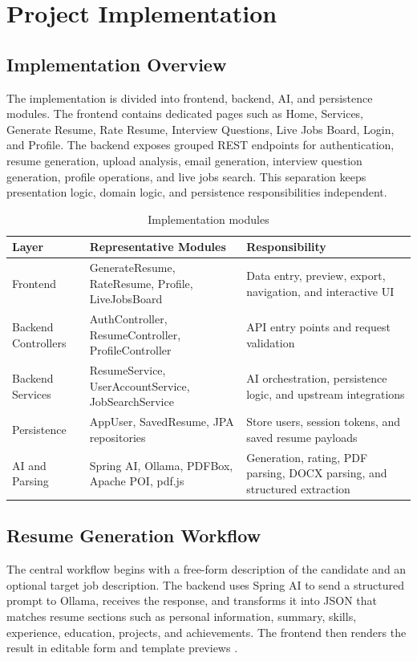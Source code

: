\section{Project Implementation}
\subsection{Implementation Overview}
\noindent The implementation is divided into frontend, backend, AI, and persistence modules. The frontend contains dedicated pages such as Home, Services, Generate Resume, Rate Resume, Interview Questions, Live Jobs Board, Login, and Profile. The backend exposes grouped REST endpoints for authentication, resume generation, upload analysis, email generation, interview question generation, profile operations, and live jobs search. This separation keeps presentation logic, domain logic, and persistence responsibilities independent.

\begin{table}[H]
\centering
\caption{Implementation modules}
\begin{tabular}{|p{3.3cm}|p{4.0cm}|p{4.8cm}|}
\hline
\textbf{Layer} & \textbf{Representative Modules} & \textbf{Responsibility} \\
\hline
Frontend & GenerateResume, RateResume, Profile, LiveJobsBoard & Data entry, preview, export, navigation, and interactive UI \\
\hline
Backend Controllers & AuthController, ResumeController, ProfileController & API entry points and request validation \\
\hline
Backend Services & ResumeService, UserAccountService, JobSearchService & AI orchestration, persistence logic, and upstream integrations \\
\hline
Persistence & AppUser, SavedResume, JPA repositories & Store users, session tokens, and saved resume payloads \\
\hline
AI and Parsing & Spring AI, Ollama, PDFBox, Apache POI, pdf.js & Generation, rating, PDF parsing, DOCX parsing, and structured extraction \\
\hline
\end{tabular}
\end{table}

\subsection{Resume Generation Workflow}
\noindent The central workflow begins with a free-form description of the candidate and an optional target job description. The backend uses Spring AI to send a structured prompt to Ollama, receives the response, and transforms it into JSON that matches resume sections such as personal information, summary, skills, experience, education, projects, and achievements. The frontend then renders the result in editable form and template previews \cite{spring_ai_docs,ollama_docs}.

